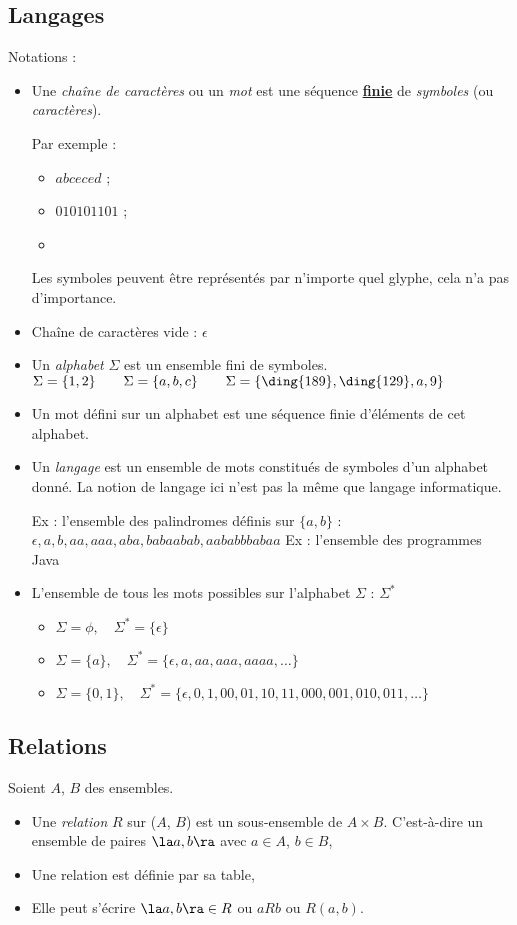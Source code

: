 \subsection{Langages}
\label{subsec:Langages}
Notations :
\begin{itemize}
    \item Une \emph{chaîne de caractères} ou un \emph{mot} est une séquence \textbf{\underline{finie}} de \emph{symboles} (ou \emph{caractères}).

    Par exemple :
    	\begin{itemize}
    		\item $abceced$ ;
    		\item $010101101$ ;
     		\item {}
    	\end{itemize}
    	Les symboles peuvent être représentés par n'importe quel glyphe, cela n'a pas d'importance.
	\item Chaîne de caractères vide : $\epsilon$
    \item Un \emph{alphabet} $\Sigma$ est un ensemble fini de symboles.
    	\subitem $\Sigma = \{1, 2\}\qquad\Sigma = \{a, b, c\}\qquad\Sigma = \{\ding{189},\ding{129},a,9\}$
    \item Un mot défini sur un alphabet est une séquence finie d'éléments de cet alphabet.
    \item Un \emph{langage} est un ensemble de mots constitués de symboles d'un alphabet donné. La notion de langage ici n'est pas la même que langage informatique.

    	\subitem Ex : l'ensemble des palindromes définis sur $\{a, b\}$ : $\epsilon, a, b, aa, aaa, aba, babaabab, aababbbabaa$
	\subitem Ex : l'ensemble des programmes Java
	\item L'ensemble de tous les mots possibles sur l'alphabet $\Sigma$ :\; $\Sigma^*$
		\begin{itemize}
			\item $\Sigma = \phi,\quad \Sigma^* = \{\epsilon\}$
			\item $\Sigma = \{a\},\quad \Sigma^* = \{\epsilon, a,aa,aaa,aaaa, \ldots\}$
			\item $\Sigma = \{0,1\},\quad \Sigma^* = \{\epsilon, 0,1,00,01,10,11,000,001,010,011, \ldots\}$
		\end{itemize}
\end{itemize}


\subsection{Relations}
\label{subsec:relations}
Soient $A$, $B$ des ensembles.
\begin{itemize}
	\item Une \emph{relation} $R$ sur ($A$, $B$) est un sous-ensemble de $A \times B$. C'est-à-dire
		un ensemble de paires $\la a,b \ra$ avec $a\in A$, $b\in B$,
	\item Une relation est définie par sa table,
	\item Elle peut s'écrire $\la a,b \ra \in R$ ou $aR b$ ou $R(a,b)$.
\end{itemize}

